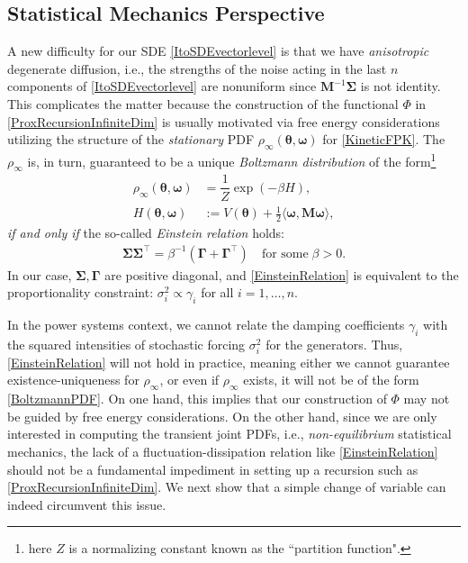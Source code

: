 \documentclass[10pt,twocolumn]{IEEEtran}
\begin{document}
\subsection{Statistical Mechanics Perspective}
A new difficulty for our SDE \eqref{ItoSDEvectorlevel} is that we have \emph{anisotropic} degenerate diffusion, i.e., the strengths of the noise acting in the last $n$ components of \eqref{ItoSDEvectorlevel} are nonuniform since $\bm{M}^{-1}\bm{\Sigma}$ is not identity. This complicates the matter because the construction of the functional $\Phi$ in \eqref{ProxRecursionInfiniteDim} is usually motivated via free energy considerations utilizing the structure of the \emph{stationary} PDF $\rho_{\infty}(\bm{\theta},\bm{\omega})$ for \eqref{KineticFPK}. The $\rho_{\infty}$ is, in turn, guaranteed to be a unique \emph{Boltzmann distribution} of the form\footnote{here $Z$ is a normalizing constant known as the ``partition function".}
\begin{subequations}
\begin{align}
\rho_{\infty}\left(\bm{\theta},\bm{\omega}\right) &= \dfrac{1}{Z}\exp\left(-\beta H\right), \\
H(\bm{\theta},\bm{\omega}) &:= V(\bm{\theta}) + \frac{1}{2}\langle\bm{\omega},\bm{M\omega}\rangle,	
\end{align}	
\label{BoltzmannPDF}
\end{subequations}
\emph{if and only if} the so-called \emph{Einstein relation} \cite{hernandez1989equilibrium,chen2015fast} holds:
\begin{align}
\bm{\Sigma}\bm{\Sigma}^{\top} = \beta^{-1}\left(\bm{\Gamma} + \bm{\Gamma}^{\top}\right) \quad\text{for some}\;\beta > 0.
\label{EinsteinRelation}	
\end{align}
In our case, $\bm{\Sigma,\Gamma}$ are positive diagonal, and \eqref{EinsteinRelation} is equivalent to the proportionality constraint: $\sigma_{i}^{2} \propto \gamma_{i}$ for all $i=1,\hdots,n$.

In the power systems context, we cannot relate the damping coefficients $\gamma_i$ with the squared intensities of stochastic forcing $\sigma_{i}^{2}$ for the generators. Thus, \eqref{EinsteinRelation} will not hold in practice, meaning either we cannot guarantee existence-uniqueness for $\rho_{\infty}$, or even if $\rho_{\infty}$ exists, it will not be of the form \eqref{BoltzmannPDF}. On one hand, this implies that our construction of $\Phi$ may not be guided by free energy considerations. On the other hand, since we are only interested in computing the transient joint PDFs, i.e., \emph{non-equilibrium} statistical mechanics, the lack of a fluctuation-dissipation relation like \eqref{EinsteinRelation} should not be a fundamental impediment in setting up a recursion such as \eqref{ProxRecursionInfiniteDim}. We next show that a simple change of variable can indeed circumvent this issue. 
\end{document}
